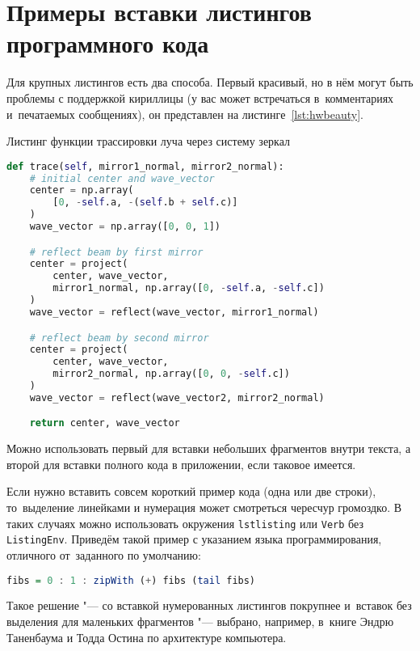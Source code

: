 \chapter{Примеры вставки листингов программного кода}\label{app:A}

Для крупных листингов есть два способа. Первый красивый, но в нём могут быть
проблемы с поддержкой кириллицы (у вас может встречаться в~комментариях
и~печатаемых сообщениях), он представлен на листинге~\cref{lst:hwbeauty}.
\begin{ListingEnv}[!h]%
\captiondelim{ } %
\caption{Листинг функции трассировки луча через систему зеркал}\label{lst:beam_trace}
\begin{lstlisting}[language=Python]
def trace(self, mirror1_normal, mirror2_normal):
    # initial center and wave_vector
    center = np.array(
        [0, -self.a, -(self.b + self.c)]
    )
    wave_vector = np.array([0, 0, 1])

    # reflect beam by first mirror
    center = project(
        center, wave_vector, 
        mirror1_normal, np.array([0, -self.a, -self.c])
    )
    wave_vector = reflect(wave_vector, mirror1_normal)

    # reflect beam by second mirror
    center = project(
        center, wave_vector, 
        mirror2_normal, np.array([0, 0, -self.c])
    )
    wave_vector = reflect(wave_vector2, mirror2_normal)

    return center, wave_vector
\end{lstlisting}
\end{ListingEnv}


Можно использовать первый для вставки небольших фрагментов
внутри текста, а второй для вставки полного
кода в приложении, если таковое имеется.

Если нужно вставить совсем короткий пример кода (одна или две строки),
то~выделение  линейками и нумерация может смотреться чересчур громоздко.
В таких случаях можно использовать окружения \texttt{lstlisting} или
\texttt{Verb} без \texttt{ListingEnv}. Приведём такой пример
с указанием языка программирования, отличного от~заданного по умолчанию:
\begin{lstlisting}[language=Haskell]
fibs = 0 : 1 : zipWith (+) fibs (tail fibs)
\end{lstlisting}
Такое решение "--- со вставкой нумерованных листингов покрупнее
и~вставок без выделения для маленьких фрагментов "--- выбрано,
например, в~книге Эндрю Таненбаума и Тодда Остина по архитектуре
компьютера.

